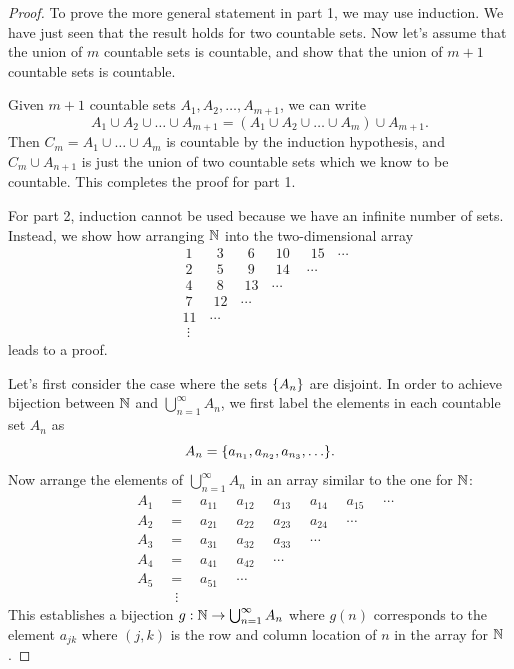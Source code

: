 \documentclass[11pt,twoside=off,numbers=noenddot]{scrbook}
\begin{document}
\begin{proof}
    To prove the more general statement in part 1, we may use induction. We have just seen that the result holds for two countable sets. Now let's assume that the union of $m$ countable sets is countable, and show that the union of $m + 1$ countable sets is countable.

    Given $m + 1$ countable sets $A_1, A_2, \dots, A_{m + 1}$, we can write
    \[ A_1 \cup A_2 \cup \dots \cup A_{m + 1} = (A_1 \cup A_2 \cup \dots \cup A_m) \cup A_{m + 1}. \]
    Then $C_m = A_1 \cup \dots \cup A_m$ is countable by the induction hypothesis, and $C_m \cup A_{n + 1}$ is just the union of two countable sets which we know to be countable. This completes the proof for part 1.

    For part 2, induction cannot be used because we have an infinite number of sets. Instead, we show how arranging $\mathbb N$ into the two-dimensional array
    \begin{align*}
        & \: 1 \quad\,\,\, \: 3 \quad\,\,\, \: 6 \quad\,\,\, 10 \quad\,\,\, 15 \:\:\,\,\, \cdots \\
        & \: 2 \quad\,\,\, \: 5 \quad\,\,\, \: 9 \quad\,\,\, 14 \quad\: \cdots \\
        & \: 4 \quad\,\,\, \: 8 \quad\,\,\, 13 \:\:\,\,\, \cdots \\
        & \: 7 \quad\,\,\, 12 \:\:\,\,\, \cdots \\
        & 11 \:\:\,\,\, \cdots \\
        & \,\, \vdots
    \end{align*}
    leads to a proof.

    Let's first consider the case where the sets $\{ A_n \}$ are disjoint. In order to achieve bijection between $\mathbb N$ and $\bigcup_{n = 1}^{\infty} A_n$, we first label the elements in each countable set $A_n$ as
    \[ A_n = \set{a_{n_1}, a_{n_2}, a_{n_3}, \dots}. \]
    Now arrange the elements of $\bigcup_{n = 1}^{\infty} A_n$ in an array similar to the one for $\mathbb N$:
    \begin{align*}
        & A_1 \quad = \quad a_{11} \quad\,\, a_{12} \quad\,\, a_{13} \quad\,\, a_{14} \quad\,\, a_{15} \quad\,\, \cdots \\
        & A_2 \quad = \quad a_{21} \quad\,\, a_{22} \quad\,\, a_{23} \quad\,\, a_{24} \quad\,\, \cdots \\
        & A_3 \quad = \quad a_{31} \quad\,\, a_{32} \quad\,\, a_{33} \quad\,\, \cdots \\
        & A_4 \quad = \quad a_{41} \quad\,\, a_{42} \quad\,\, \cdots \\
        & A_5 \quad = \quad a_{51} \quad\,\, \cdots \\
        & \qquad\:\,\,\, \vdots
    \end{align*}
    This establishes a bijection $g : \mathbb N \to \bigcup_{n = 1}^{\infty} A_n$ where $g(n)$ corresponds to the element $a_{jk}$ where $(j, k)$ is the row and column location of $n$ in the array for $\mathbb N$.


\end{proof}
\end{document}
